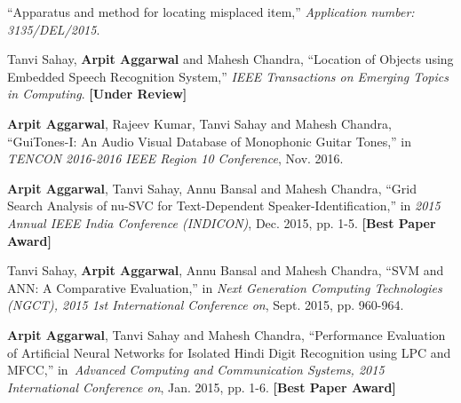 \vspace{-1em}
\begin{cventries}
\cventry
{}
{}
{}
{}
{
 \begin{cvlist}
	\item ``Apparatus and method for locating misplaced item,'' \textit{Application number: 3135/DEL/2015}.
 \end{cvlist}
}
\cventry
{}
{}
{}
{}
{\begin{cvlist}
	\item Tanvi Sahay, \textbf{Arpit Aggarwal} and Mahesh Chandra, ``Location of Objects using Embedded Speech Recognition System,'' \textit{IEEE Transactions on Emerging Topics in Computing}. \textbf{[\scriptsize Under Review]}
 \end{cvlist}
 }
\cventry
{}
{}
{}
{}
{\begin{cvlist}
	\item \textbf{Arpit Aggarwal}, Rajeev Kumar, Tanvi Sahay and Mahesh Chandra, ``GuiTones-I: An Audio Visual Database of Monophonic Guitar Tones,'' in \textit{TENCON 2016-2016 IEEE Region 10 Conference}, Nov. 2016. 
	\item \textbf{Arpit Aggarwal}, Tanvi Sahay, Annu Bansal and Mahesh Chandra, ``Grid Search Analysis of nu-SVC for Text-Dependent Speaker-Identiﬁcation,'' in \textit{2015 Annual IEEE India Conference (INDICON)}, Dec. 2015, pp. 1-5. \textbf{[\scriptsize Best Paper Award]} \href{http://ieeexplore.ieee.org/xpl/articleDetails.jsp?arnumber=7443790}{}
	\item Tanvi Sahay, \textbf{Arpit Aggarwal}, Annu Bansal and Mahesh Chandra, ``SVM and ANN: A Comparative Evaluation,'' in \textit{Next Generation Computing Technologies (NGCT), 2015 1st International Conference on}, Sept. 2015, pp. 960-964. \href{http://ieeexplore.ieee.org/xpl/articleDetails.jsp?arnumber=7375263}{}
	\item \textbf{Arpit Aggarwal}, Tanvi Sahay and Mahesh Chandra, ``Performance Evaluation of Artificial Neural Networks for Isolated Hindi Digit Recognition using LPC and MFCC,'' in~\textit{Advanced Computing and Communication Systems, 2015 International Conference on}, Jan. 2015, pp. 1-6. \textbf{[\scriptsize Best Paper Award]} \href{http://ieeexplore.ieee.org/xpl/articleDetails.jsp?arnumber=7324099}{}
\end{cvlist}
}
\end{cventries}




